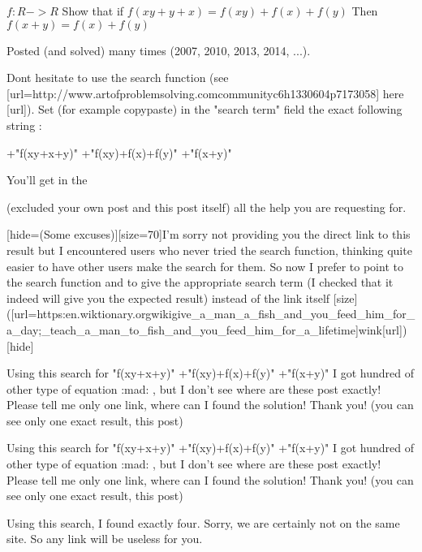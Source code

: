 \begin{solution}
	\begin{tcolorbox}$f: R-> R$
Show that if
$f(xy+y+x)=f(xy)+f(x)+f(y)$
Then 
$f(x+y)=f(x)+f(y)$\end{tcolorbox}
Posted (and solved) many times (2007, 2010, 2013, 2014, ...).

Dont hesitate to use the search function (see [url=http://www.artofproblemsolving.com\/community\/c6h1330604p7173058] here [\/url]).
Set (for example copy\/paste) in the "search term" field the exact following string : 

+"f(xy+x+y)" +"f(xy)+f(x)+f(y)" +"f(x+y)"

You'll get in the  (excluded your own post and this post itself) all the help you are requesting for.

[hide=(Some excuses)][size=70]I'm sorry not providing you the direct link to this result but I encountered users who never tried the search function, thinking quite easier to have other users make the search for them. So now I prefer to point to the search function and to give the appropriate search term (I checked that it indeed will give you the expected result) instead of the link itself [\/size]([url=https:\/\/en.wiktionary.org\/wiki\/give_a_man_a_fish_and_you_feed_him_for_a_day;_teach_a_man_to_fish_and_you_feed_him_for_a_lifetime]wink[\/url])[\/hide]



\end{solution}



\begin{solution}
	Using this search for "f(xy+x+y)" +"f(xy)+f(x)+f(y)" +"f(x+y)" I got  hundred of other type of equation  :mad: , but I don't see where are these post exactly! Please tell me only one link, where can I found the solution! Thank you! (you can see only one exact result, this post)
\end{solution}



\begin{solution}
	\begin{tcolorbox}Using this search for "f(xy+x+y)" +"f(xy)+f(x)+f(y)" +"f(x+y)" I got  hundred of other type of equation  :mad: , but I don't see where are these post exactly! Please tell me only one link, where can I found the solution! Thank you! (you can see only one exact result, this post)\end{tcolorbox}
Using this search, I found exactly four.
Sorry, we are certainly not on the same site.
So any link will be useless for you.



\end{solution}



